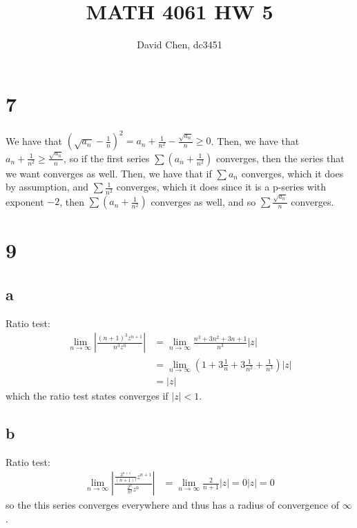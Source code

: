 \documentclass[12pt,letterpaper]{article}
\title{MATH 4061 HW 5}
\author{David Chen, dc3451}
\theoremstyle{definition}
\begin{document}
\maketitle

\section*{7}

We have that $(\sqrt{a_{n}} - \frac{1}{n})^{2} = a_{n} + \frac{1}{n^{2}} - \frac{\sqrt{a_{n}}}{n} \geq 0$. Then, we have that $a_{n} + \frac{1}{n^{2}} \geq \frac{\sqrt{a_{n}}}{n}$, so if the first series $\sum (a_{n} + \frac{1}{n^{2}})$ converges, then the series that we want converges as well. Then, we have that if $\sum a_{n}$ converges, which it does by assumption, and $\sum \frac{1}{n^{2}}$ converges, which it does since it is a p-series with exponent $-2$, then $\sum (a_{n} + \frac{1}{n^{2}})$ converges as well, and so $\sum \frac{\sqrt{a_{n}}}{n}$ converges.

\section*{9}

\subsection*{a}

Ratio test:
\begin{align*}
  \lim_{n \rightarrow \infty}\left|\frac{(n + 1)^{3}z^{n+1}}{n^{3}z^{n}}\right| &= \lim_{n \rightarrow \infty}\frac{n^{3} + 3n^{2} + 3n + 1}{n^{3}}|z| \\
                                                       &= \lim_{n \rightarrow \infty}\left(1 + 3\frac{1}{n} + 3\frac{1}{n^{2}} + \frac{1}{n^{3}}\right)|z| \\
                                                       &= |z|
\end{align*}
which the ratio test states converges if $|z| < 1$.

\subsection*{b}

Ratio test:
\begin{align*}
  \lim_{n \rightarrow \infty}\left|\frac{\frac{2^{n+1}}{(n+1)!}z^{n+1}}{\frac{2^{n}}{n!}z^{n}}\right| &= \lim_{n \rightarrow \infty} \frac{2}{n+1}|z| = 0|z| = 0
\end{align*}
so the this series converges everywhere and thus has a radius of convergence of $\infty$.
\end{document}
